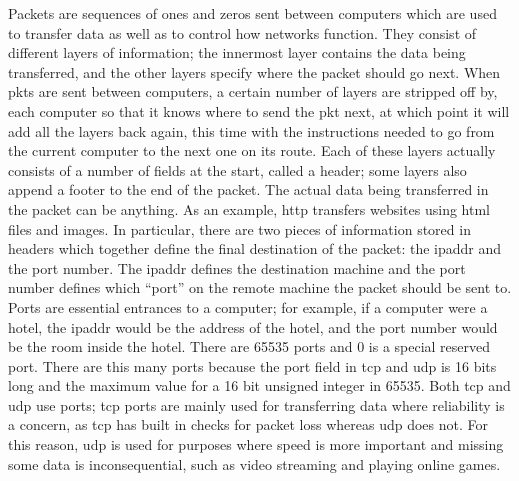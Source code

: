 \documentclass[titlepage]{article}
\begin{document}
Packets\label{packetdef} are sequences of ones and zeros sent between computers which 
are used to transfer data as well as to control how networks function. They consist of different 
layers of information; the innermost layer contains the data being transferred, and the other
layers specify where the packet should go next.
When \glspl{pkt} are sent between computers, a certain number of layers are stripped off by,
each computer so that it knows where to send the \gls{pkt} next, at which point it will add
all the layers back again, this time with the instructions needed to go from the current computer
to the next one on its route. Each of these layers actually consists of a number of fields at the
start, called a \gls{header}; some layers also append a footer to the end of the packet.
The actual data being transferred in the packet can be anything.
As an example, \gls{http} transfers websites using \gls{html} files and images. In particular,
there are two pieces of information stored in headers which together define the final destination
of the packet: the \gls{ipaddr} and the \gls{port} number.
The \gls{ipaddr} defines the destination machine and the \gls{port} number
defines which ``port'' on the remote machine the packet should be sent to. Ports are essential
entrances to a computer; for example, if a computer were a hotel, the \gls{ipaddr} would be the
address of the hotel, and the \gls{port} number would be the room inside the hotel.
There are 65535 \glspl{port} and 0 is a special reserved port.
There are this many ports because the port field in \gls{tcp} and \gls{udp} is 16 bits long and the maximum
value for a 16 bit unsigned integer in 65535.
Both \gls{tcp} and \gls{udp} use \glspl{port}; \gls{tcp} \glspl{port} are mainly used for
transferring data where reliability is a concern, as \gls{tcp} has built in checks for packet loss
whereas \gls{udp} does not.
For this reason, \gls{udp} is used for purposes where speed is more important
and missing some data is inconsequential, such as video streaming and playing online games. 
\end{document}
